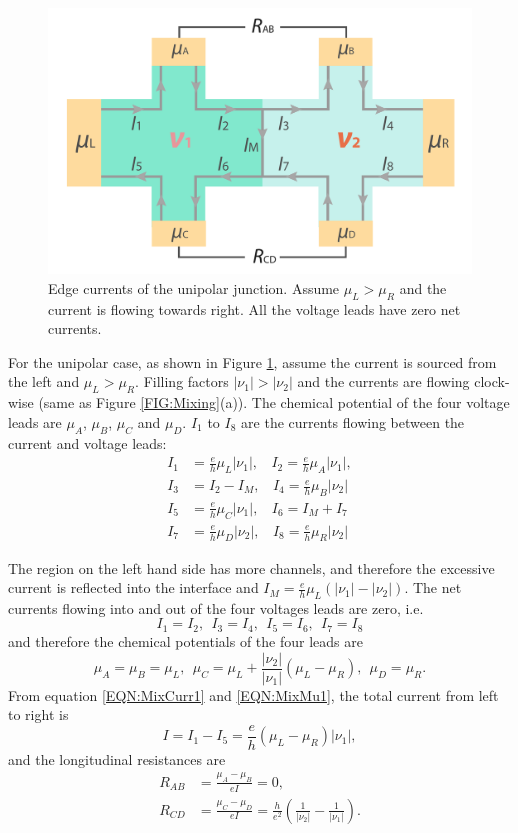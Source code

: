 \documentclass[pdflatex, sectionletters, 12pt]{pittetd}    %
\begin{document}
\begin{figure}[h!]
	\centering
	\includegraphics[width=.7\textwidth]{Drawing/Unipolar.pdf}
	\caption{Edge currents of the unipolar junction. Assume $\mu_L > \mu_R$ and the current is flowing towards right. All the voltage leads have zero net currents. }
	\label{FIG:Unipolar}
\end{figure}

For the unipolar case, as shown in Figure \ref{FIG:Unipolar}, assume the current is sourced from the left and $\mu_L > \mu_R$. Filling factors $|\nu_1| > |\nu_2|$ and the currents are flowing clock-wise (same as Figure \ref{FIG:Mixing}(a)). The chemical potential of the four voltage leads are $\mu_A$, $\mu_B$, $\mu_C$ and $\mu_D$. $I_1$ to $I_8$ are the currents flowing between the current and voltage leads:
\begin{equation}
\label{EQN:MixCurr1}
\begin{split}
I_1 & = \frac{e}{h}\mu_L|\nu_1|, \ \ \ \  I_2 = \frac{e}{h}\mu_A|\nu_1|, \\
I_3 & = I_2 - I_M, \ \ \ \ I_4 = \frac{e}{h}\mu_B|\nu_2| \\
I_5 & = \frac{e}{h}\mu_C|\nu_1|, \ \ \ \ I_6 = I_M + I_7 \\
I_7 & = \frac{e}{h}\mu_D|\nu_2|, \ \ \ \ I_8 = \frac{e}{h}\mu_R|\nu_2|
\end{split}
\end{equation}

The region on the left hand side has more channels, and therefore the excessive current is reflected into the interface and $I_M = \frac{e}{h}\mu_L(|\nu_1|-|\nu_2|)$. The net currents flowing into and out of the four voltages leads are zero, i.e.
$$
I_1 = I_2, \ \ I_3 = I_4, \ \ I_5 = I_6, \ \ I_7 = I_8
$$
and therefore the chemical potentials of the four leads are
\begin{equation}
\label{EQN:MixMu1}
\mu_A = \mu_B = \mu_L, \ \ \mu_C = \mu_L + \frac{|\nu_2|}{|\nu_1|}(\mu_L - \mu_R), \ \ \mu_D = \mu_R.
\end{equation}
From equation \ref{EQN:MixCurr1} and \ref{EQN:MixMu1}, the total current from left to right is 
$$
I = I_1 - I_5 = \frac{e}{h}(\mu_L - \mu_R)|\nu_1|,
$$ 
and the longitudinal resistances are 
\begin{equation}
\label{EQN:Mixing1}
\begin{split}
R_{AB} & = \frac{\mu_A - \mu_B}{eI} = 0, \\
R_{CD} & = \frac{\mu_C - \mu_D}{eI} = \frac{h}{e^2}\left(\frac{1}{|\nu_2|} - \frac{1}{|\nu_1|}\right).
\end{split}
\end{equation}
\end{document}
